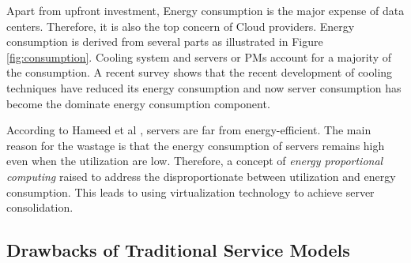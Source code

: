 Apart from upfront investment, Energy consumption \cite{Kaplan:up01fR-k} is the major expense of data centers. Therefore, it is also the top concern of Cloud providers. Energy consumption is derived from several parts as illustrated in Figure \ref{fig:consumption}. Cooling system and servers or PMs account for a majority of the consumption. A recent survey \cite{Cho:2016kz} shows that the recent development of cooling techniques have reduced its energy consumption and now server consumption has become the dominate energy consumption component. 

According to Hameed et al \cite{Hameed:2016cma}, 
servers are far from energy-efficient. 
The main reason for the wastage is that the energy consumption of servers remains high even when the utilization are low. Therefore, a concept of
\emph{energy proportional computing} \cite{Barroso:2007jt} raised to address the disproportionate between utilization and energy consumption. This leads to 
using virtualization technology to achieve server consolidation.


\subsection{Drawbacks of Traditional Service Models}

